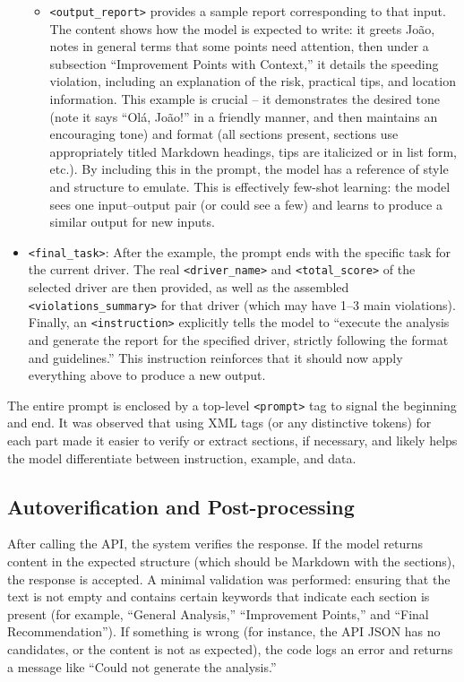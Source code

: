 \documentclass[12pt]{article}
\begin{document}
\begin{itemize}
\begin{itemize}
        \item \verb|<output_report>| provides a sample report corresponding to that input. The content shows how the model is expected to write: it greets João, notes in general terms that some points need attention, then under a subsection “Improvement Points with Context,” it details the speeding violation, including an explanation of the risk, practical tips, and location information. This example is crucial – it demonstrates the desired tone (note it says “Olá, João!” in a friendly manner, and then maintains an encouraging tone) and format (all sections present, sections use appropriately titled Markdown headings, tips are italicized or in list form, etc.). By including this in the prompt, the model has a reference of style and structure to emulate. This is effectively few-shot learning: the model sees one input–output pair (or could see a few) and learns to produce a similar output for new inputs.
    \end{itemize}
    \item \verb|<final_task>|: After the example, the prompt ends with the specific task for the current driver. The real \verb|<driver_name>| and \verb|<total_score>| of the selected driver are then provided, as well as the assembled \verb|<violations_summary>| for that driver (which may have 1–3 main violations). Finally, an \verb|<instruction>| explicitly tells the model to “execute the analysis and generate the report for the specified driver, strictly following the format and guidelines.” This instruction reinforces that it should now apply everything above to produce a new output.
\end{itemize}
The entire prompt is enclosed by a top-level \verb|<prompt>| tag to signal the beginning and end. It was observed that using XML tags (or any distinctive tokens) for each part made it easier to verify or extract sections, if necessary, and likely helps the model differentiate between instruction, example, and data.

\subsection{Autoverification and Post-processing}

After calling the API, the system verifies the response. If the model returns content in the expected structure (which should be Markdown with the sections), the response is accepted. A minimal validation was performed: ensuring that the text is not empty and contains certain keywords that indicate each section is present (for example, “General Analysis,” “Improvement Points,” and “Final Recommendation”). If something is wrong (for instance, the API JSON has no candidates, or the content is not as expected), the code logs an error and returns a message like “Could not generate the analysis.”
\end{document}
